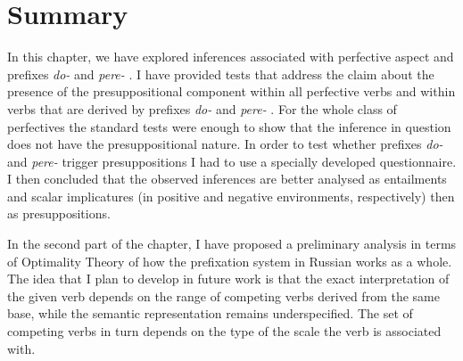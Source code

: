 \section{Summary}
In this chapter, we have explored inferences associated with perfective aspect and prefixes \textit{do-}   and \textit{pere-}  . I have provided tests that address the claim about the presence of the presuppositional component within all perfective verbs  and within verbs that are derived by prefixes \textit{do-}   and \textit{pere-}  . For the whole class of perfectives the standard tests were enough to show that the inference in question does not have the presuppositional nature. In order to test whether prefixes \textit{do-}   and \textit{pere-}   trigger presuppositions I had to use a specially developed questionnaire. I then concluded that the observed inferences are better analysed as entailments and scalar implicatures (in positive and negative environments, respectively) then as presuppositions.

In the second part of the chapter, I have proposed a preliminary analysis in terms of Optimality Theory of how the prefixation  system in Russian works as a whole. The idea that I plan to develop in future  work is that the exact interpretation of the given verb depends on the range of competing verbs derived from the same base, while the semantic representation remains underspecified. The set of competing verbs in turn depends on the type of the scale the verb is associated with.


